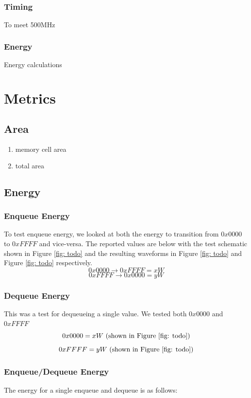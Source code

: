 \documentclass[a4paper]{article}
\begin{document}
\subsubsection{Timing}
To meet 500MHz

\subsubsection{Energy}
Energy calculations



\section{Metrics}
\label{sec:mtrics}

\subsection{Area}
\begin{enumerate}
\item memory cell area
\item total area
\end{enumerate}

\subsection{Energy}
\subsubsection{Enqueue Energy}
To test enqueue energy, we looked at both the energy to transition from $0x0000$ to $0xFFFF$ and vice-versa. The reported values are below with the test schematic shown in Figure \ref{fig: todo} and the resulting waveforms in Figure \ref{fig: todo} and Figure \ref{fig: todo} respectively.
$$0x0000 \rightarrow 0xFFFF = xW$$
$$0xFFFF \rightarrow 0x0000 = yW$$
\subsubsection{Dequeue Energy}
This was a test for dequeueing a single value. We tested both $0x0000$ and $0xFFFF$
$$0x0000 = xW\textnormal{ (shown in Figure \ref{fig: todo})}$$
$$0xFFFF = yW\textnormal{ (shown in Figure \ref{fig: todo})}$$

\subsubsection{Enqueue/Dequeue Energy}
The energy for a single enqueue and dequeue is as follows:
\end{document}
